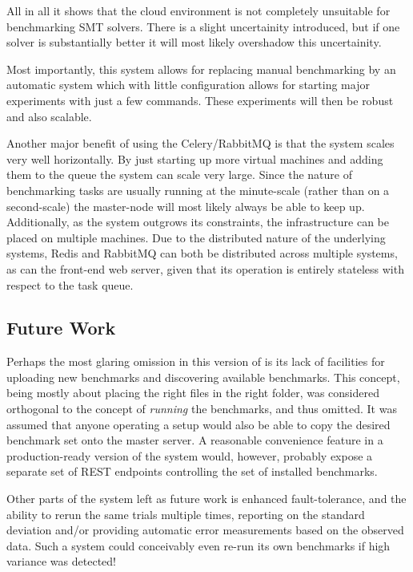 \documentclass[a4paper]{IEEEtran}
\begin{document}
All in all it shows that the cloud environment is not completely
unsuitable for benchmarking SMT solvers. There is a slight
uncertainity introduced, but if one solver is substantially better it
will most likely overshadow this uncertainity.

Most importantly, this system allows for replacing manual benchmarking
by an automatic system which with little configuration allows for
starting major experiments with just a few commands. These experiments
will then be robust and also scalable. 

Another major benefit of using the Celery/RabbitMQ is that the system
scales very well horizontally. By just starting up more virtual
machines and adding them to the queue the system can scale very
large. Since the nature of benchmarking tasks are usually running at
the minute-scale (rather than on a second-scale) the master-node will
most likely always be able to keep up. Additionally, as the system
outgrows its constraints, the infrastructure can be placed on multiple
machines. Due to the distributed nature of the underlying systems,
Redis and RabbitMQ can both be distributed across multiple systems, as
can the front-end web server, given that its operation is entirely
stateless with respect to the task queue.

\subsection{Future Work}

Perhaps the most glaring omission in this version of \testbench{} is its lack of
facilities for uploading new benchmarks and discovering available benchmarks.
This concept, being mostly about placing the right files in the right folder,
was considered orthogonal to the concept of \emph{running} the benchmarks, and
thus omitted. It was assumed that anyone operating a \testbench{} setup would
also be able to copy the desired benchmark set onto the master server. A
reasonable convenience feature in a production-ready version of the system
would, however, probably expose a separate set of REST endpoints controlling the
set of installed benchmarks.

Other parts of the system left as future work is enhanced fault-tolerance, and
the ability to rerun the same trials multiple times, reporting on the standard
deviation and/or providing automatic error measurements based on the observed
data. Such a system could conceivably even re-run its own benchmarks if high
variance was detected!
\end{document}
